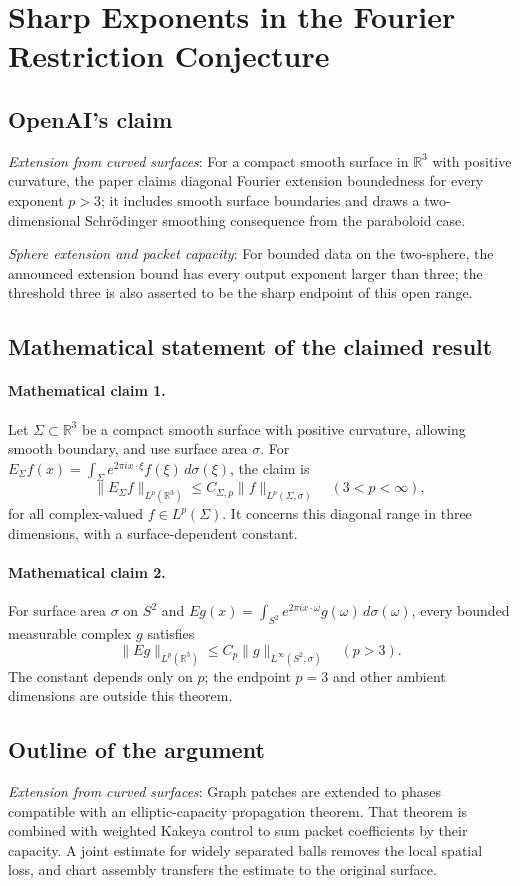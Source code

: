 \documentclass[11pt]{article}
\begin{document}
\section*{Sharp Exponents in the Fourier Restriction Conjecture}

\subsection{OpenAI's claim}
\textit{Extension from curved surfaces}: For a compact smooth surface in $\mathbb R^3$ with positive curvature, the paper claims diagonal Fourier extension boundedness for every exponent $p>3$; it includes smooth surface boundaries and draws a two-dimensional Schrödinger smoothing consequence from the paraboloid case.

\textit{Sphere extension and packet capacity}: For bounded data on the two-sphere, the announced extension bound has every output exponent larger than three; the threshold three is also asserted to be the sharp endpoint of this open range.

\subsection{Mathematical statement of the claimed result}
\paragraph{Mathematical claim 1.} Let $\Sigma\subset\mathbb R^3$ be a compact smooth surface with positive curvature, allowing smooth boundary, and use surface area $\sigma$. For $E_\Sigma f(x)=\int_\Sigma e^{2\pi ix\cdot\xi}f(\xi)\,d\sigma(\xi)$, the claim is \[\|E_\Sigma f\|_{L^p(\mathbb R^3)}\le C_{\Sigma,p}\|f\|_{L^p(\Sigma,\sigma)}\quad(3<p<\infty),\] for all complex-valued $f\in L^p(\Sigma)$. It concerns this diagonal range in three dimensions, with a surface-dependent constant.

\paragraph{Mathematical claim 2.} For surface area $\sigma$ on $S^2$ and $Eg(x)=\int_{S^2}e^{2\pi ix\cdot\omega}g(\omega)\,d\sigma(\omega)$, every bounded measurable complex $g$ satisfies \[\|Eg\|_{L^p(\mathbb R^3)}\le C_p\|g\|_{L^\infty(S^2,\sigma)}\quad(p>3).\] The constant depends only on $p$; the endpoint $p=3$ and other ambient dimensions are outside this theorem.

\subsection{Outline of the argument}
\textit{Extension from curved surfaces}: Graph patches are extended to phases compatible with an elliptic-capacity propagation theorem. That theorem is combined with weighted Kakeya control to sum packet coefficients by their capacity. A joint estimate for widely separated balls removes the local spatial loss, and chart assembly transfers the estimate to the original surface.
\end{document}
